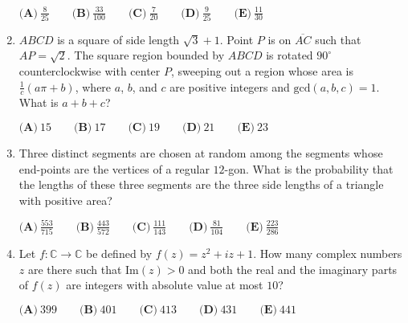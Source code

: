 \documentclass{article}
\begin{document}
\begin{enumerate}[label=\arabic*., itemsep=0.5em]
$ \textbf{(A)} \ \frac{8}{25} \qquad \textbf{(B)} \ \frac{33}{100} \qquad \textbf{(C)} \ \frac{7}{20} \qquad \textbf{(D)} \ \frac{9}{25} \qquad \textbf{(E)} \ \frac{11}{30}$\par \vspace{0.5em}\item $ ABCD$ is a square of side length $ \sqrt{3} + 1 $. Point $ P $ is on $ \overline{AC} $ such that $ AP = \sqrt{2} $. The square region bounded by $ ABCD $ is rotated $ 90^{\circ} $ counterclockwise with center $ P $, sweeping out a region whose area is $ \frac{1}{c} (a \pi + b) $, where $a $, $b$, and $ c $ are positive integers and $ \text{gcd}(a,b,c) = 1 $. What is $ a + b + c $?

$\textbf{(A)} \ 15 \qquad \textbf{(B)} \ 17 \qquad \textbf{(C)} \ 19 \qquad \textbf{(D)} \ 21 \qquad \textbf{(E)} \ 23 $\par \vspace{0.5em}\item Three distinct segments are chosen at random among the segments whose end-points are the vertices of a regular $12$-gon. What is the probability that the lengths of these three segments are the three side lengths of a triangle with positive area?

$ \textbf{(A)} \ \frac{553}{715} \qquad \textbf{(B)} \ \frac{443}{572} \qquad \textbf{(C)} \ \frac{111}{143} \qquad \textbf{(D)} \ \frac{81}{104} \qquad \textbf{(E)} \ \frac{223}{286}$\par \vspace{0.5em}\item Let $f : \mathbb{C} \to \mathbb{C} $ be defined by $ f(z) = z^2 + iz + 1 $. How many complex numbers $z $ are there such that $ \text{Im}(z) > 0 $ and both the real and the imaginary parts of $f(z)$ are integers with absolute value at most $ 10 $?

$ \textbf{(A)} \ 399 \qquad \textbf{(B)} \ 401 \qquad \textbf{(C)} \ 413 \qquad \textbf{(D)} \ 431 \qquad \textbf{(E)} \ 441 $\par \vspace{0.5em}\end{enumerate}
\end{document}
